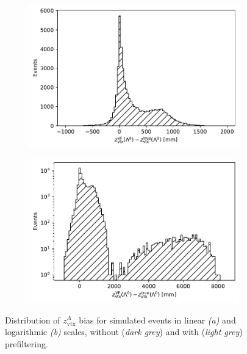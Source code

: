 \begin{figure}[t]
	\centering
	\begin{subfigure}{.45\textwidth}
		\includegraphics[width=\textwidth]{graphics/04-event_selection/Lambda_endvertex_bias_z.pdf}
		\caption{}
		\label{fig:4:lz_endvertex_bias_linear}
	\end{subfigure}
	\begin{subfigure}{.45\textwidth}
		\includegraphics[width=\textwidth]{graphics/04-event_selection/Lambda_endvertex_bias_z_log.pdf}
		\caption{}
		\label{fig:4:lz_endvertex_bias_log}
	\end{subfigure}
	\caption{Distribution of $z_\text{vtx}^\Lambda$ bias for simulated \demonstratorshort events in linear \textit{(a)} and logarithmic \textit{(b)} scales, without (\textit{dark grey}) and with (\textit{light grey}) prefiltering.}
	\label{fig:4:lz_endvertex_bias}
\end{figure}

